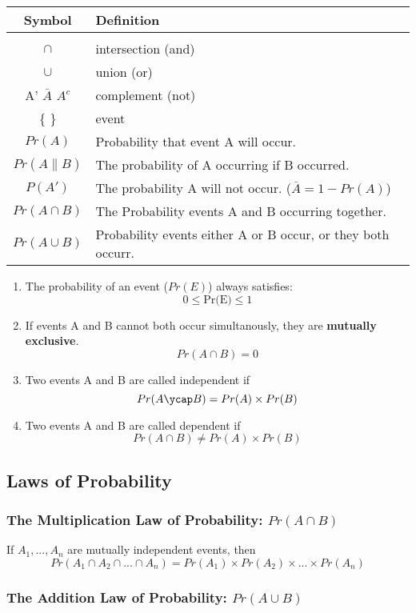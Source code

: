 \documentclass[12pt,]{article}
\providecommand{\tightlist}{%
  \setlength{\itemsep}{0pt}\setlength{\parskip}{0pt}}
\begin{document}
\begin{longtable}[]{@{}cl@{}}
\toprule
Symbol & Definition\tabularnewline
\midrule
\endhead
&\tabularnewline
\(\cap\) & intersection (and)\tabularnewline
\(\cup\) & union (or)\tabularnewline
A' \(\bar{A}\) \(A^c\) & complement (not)\tabularnewline
\{ \} & event\tabularnewline
\(Pr(A)\) & Probability that event A will occur.\tabularnewline
\(Pr(A\|B)\) & The probability of A occurring if B
occurred.\tabularnewline
\(P(A')\) & The probability A will not occur.
(\(\bar{A}=1-Pr(A)\))\tabularnewline
\(Pr(A\cap B)\) & The Probability events A and B occurring
together.\tabularnewline
\(Pr(A\cup B)\) & Probability events either A or B occur, or they both
occurr.\tabularnewline
\bottomrule
\end{longtable}

\begin{enumerate}
\def\labelenumi{\arabic{enumi}.}
\tightlist
\item
  The probability of an event (\(Pr(E)\)) always satisfies:
  \[0 \leq \text{Pr(E)} \leq 1\]
\item
  If events A and B cannot both occur simultanously, they are
  \textbf{mutually exclusive}. \[Pr(A\cap B)=0\]
\item
  Two events A and B are called independent if
  \[Pr(A\ycap B)=Pr(A)\times Pr(B)\]
\item
  Two events A and B are called dependent if
  \[Pr(A\cap B)\ne Pr(A)\times Pr(B)\]
\end{enumerate}

\hypertarget{laws-of-probability}{%
\subsection{Laws of Probability}\label{laws-of-probability}}

\hypertarget{the-multiplication-law-of-probability-pracap-b}{%
\subsubsection{\texorpdfstring{The Multiplication Law of Probability:
\(Pr(A\cap B)\)}{The Multiplication Law of Probability: Pr(A\textbackslash{}cap B)}}\label{the-multiplication-law-of-probability-pracap-b}}

If \(A_1,...,A_n\) are mutually independent events, then
\[Pr(A_1 \cap A_2 \cap ... \cap A_n) = Pr(A_1)\times Pr(A_2)\times ...\times Pr(A_n)\]

\hypertarget{the-addition-law-of-probability-pracup-b}{%
\subsubsection{\texorpdfstring{The Addition Law of Probability:
\(Pr(A\cup B)\)}{The Addition Law of Probability: Pr(A\textbackslash{}cup B)}}\label{the-addition-law-of-probability-pracup-b}}
\end{document}
